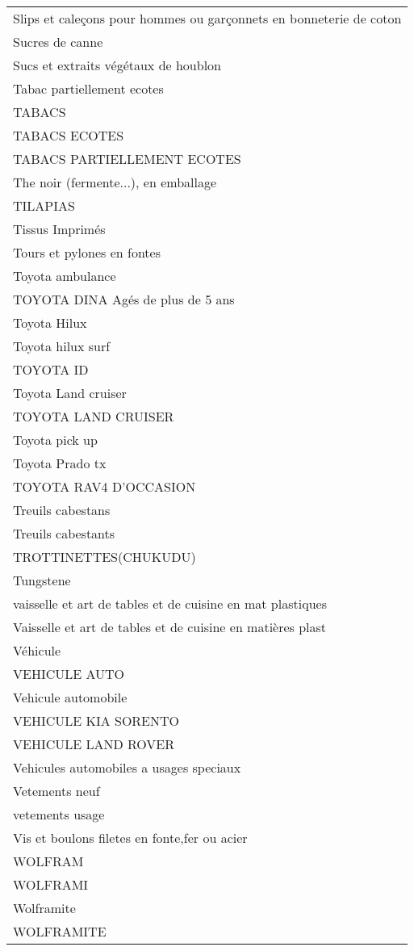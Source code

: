\documentclass[
]{book}
\begin{document}
\begin{longtable}[t]{l}
\addlinespace
Slips et caleçons pour hommes ou garçonnets en bonneterie de coton\\
Sucres de canne\\
Sucs et extraits végétaux de houblon\\
Tabac partiellement ecotes\\
TABACS\\
\addlinespace
TABACS ECOTES\\
TABACS PARTIELLEMENT ECOTES\\
The noir (fermente...), en emballage\\
TILAPIAS\\
Tissus Imprimés\\
\addlinespace
Tours et pylones en fontes\\
Toyota ambulance\\
TOYOTA DINA Agés de plus de 5 ans\\
Toyota Hilux\\
Toyota hilux surf\\
\addlinespace
TOYOTA ID\\
Toyota Land cruiser\\
TOYOTA LAND CRUISER\\
Toyota pick up\\
Toyota Prado tx\\
\addlinespace
TOYOTA RAV4 D'OCCASION\\
Treuils cabestans\\
Treuils cabestants\\
TROTTINETTES(CHUKUDU)\\
Tungstene\\
\addlinespace
vaisselle et art de tables et de cuisine en mat plastiques\\
Vaisselle et art de tables et de cuisine en matières plast\\
Véhicule\\
VEHICULE AUTO\\
Vehicule automobile\\
\addlinespace
VEHICULE KIA SORENTO\\
VEHICULE LAND ROVER\\
Vehicules automobiles a usages speciaux\\
Vetements neuf\\
vetements usage\\
\addlinespace
Vis et boulons filetes en fonte,fer ou acier\\
WOLFRAM\\
WOLFRAMI\\
Wolframite\\
WOLFRAMITE\\
\bottomrule
\end{longtable}
\end{document}
